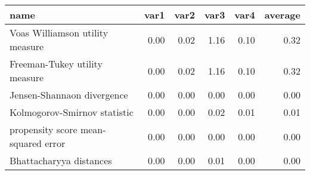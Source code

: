 \begin{tabular}{lrrrrr}
  \toprule
name & var1 & var2 & var3 & var4 & average \\ 
  \midrule
Voas Williamson utility measure & 0.00 & 0.02 & 1.16 & 0.10 & 0.32 \\ 
  Freeman-Tukey utility measure & 0.00 & 0.02 & 1.16 & 0.10 & 0.32 \\ 
  Jensen-Shannaon divergence & 0.00 & 0.00 & 0.00 & 0.00 & 0.00 \\ 
  Kolmogorov-Smirnov statistic & 0.00 & 0.00 & 0.02 & 0.01 & 0.01 \\ 
  propensity score mean-squared error & 0.00 & 0.00 & 0.00 & 0.00 & 0.00 \\ 
  Bhattacharyya distances & 0.00 & 0.00 & 0.01 & 0.00 & 0.00 \\ 
   \bottomrule
\end{tabular}
